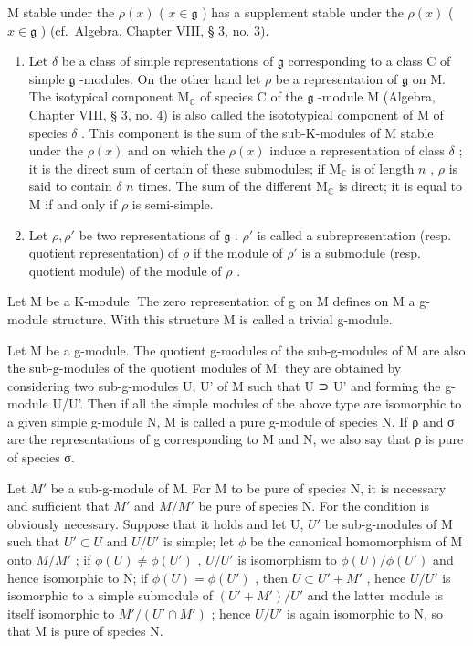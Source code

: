 M stable under the \(\rho(x)\) ( \(x \in \mathfrak{g}\) ) has a supplement stable under the \(\rho(x)\) ( \(x \in \mathfrak{g}\) ) (cf.~Algebra, Chapter VIII, § 3, no. 3).

\begin{enumerate}
\def\labelenumi{(\arabic{enumi})}
\setcounter{enumi}{4}
\item
  Let \(\delta\) be a class of simple representations of \(\mathfrak{g}\) corresponding to a class C of simple \(\mathfrak{g}\) -modules. On the other hand let \(\rho\) be a representation of \(\mathfrak{g}\) on M. The isotypical component \(\mathrm{M}_{\mathbb{C}}\) of species C of the \(\mathfrak{g}\) -module M (Algebra, Chapter VIII, § 3, no. 4) is also called the isototypical component of M of species \(\delta\) . This component is the sum of the sub-K-modules of M stable under the \(\rho(x)\) and on which the \(\rho(x)\) induce a representation of class \(\delta\) ; it is the direct sum of certain of these submodules; if \(\mathrm{M}_{\mathbb{C}}\) is of length \(n\) , \(\rho\) is said to contain \(\delta\) \(n\) times. The sum of the different \(\mathrm{M}_{\mathbb{C}}\) is direct; it is equal to M if and only if \(\rho\) is semi-simple.
\item
  Let \(\rho, \rho'\) be two representations of \(\mathfrak{g}\) . \(\rho'\) is called a subrepresentation (resp. quotient representation) of \(\rho\) if the module of \(\rho'\) is a submodule (resp. quotient module) of the module of \(\rho\) .
\end{enumerate}

Let M be a K-module. The zero representation of g on M defines on M a g-module structure. With this structure M is called a trivial g-module.

Let M be a g-module. The quotient g-modules of the sub-g-modules of M are also the sub-g-modules of the quotient modules of M: they are obtained by considering two sub-g-modules U, U' of M such that U ⊃ U' and forming the g-module U/U'. Then if all the simple modules of the above type are isomorphic to a given simple g-module N, M is called a pure g-module of species N. If ρ and σ are the representations of g corresponding to M and N, we also say that ρ is pure of species σ.

Let \(M'\) be a sub-g-module of M. For M to be pure of species N, it is necessary and sufficient that \(M'\) and \(M/M'\) be pure of species N. For the condition is obviously necessary. Suppose that it holds and let U, \(U'\) be sub-g-modules of M such that \(U' \subset U\) and \(U/U'\) is simple; let \(\phi\) be the canonical homomorphism of M onto \(M/M'\) ; if \(\phi(U) \neq \phi(U')\) , \(U/U'\) is isomorphism to \(\phi(U)/\phi(U')\) and hence isomorphic to N; if \(\phi(U) = \phi(U')\) , then \(U \subset U' + M'\) , hence \(U/U'\) is isomorphic to a simple submodule of \((U' + M')/U'\) and the latter module is itself isomorphic to \(M'/(U' \cap M')\) ; hence \(U/U'\) is again isomorphic to N, so that M is pure of species N.

